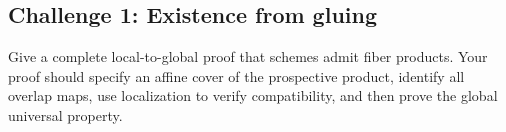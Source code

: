 \subsection*{Challenge 1: Existence from gluing}
\begin{problem}\label{chal:vi23-01}
Give a complete local-to-global proof that schemes admit fiber products. Your proof should specify an affine cover of the prospective product, identify all overlap maps, use localization to verify compatibility, and then prove the global universal property.
\end{problem}
